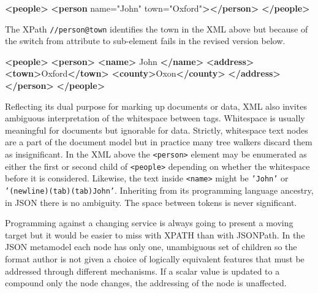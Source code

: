 \documentclass[12pt, ]{article}
\newenvironment{Shaded}{}{}
\newcommand{\KeywordTok}[1]{\textcolor[rgb]{0.00,0.44,0.13}{\textbf{{#1}}}}
\newcommand{\StringTok}[1]{\textcolor[rgb]{0.25,0.44,0.63}{{#1}}}
\newcommand{\OtherTok}[1]{\textcolor[rgb]{0.00,0.44,0.13}{{#1}}}
\newcommand{\NormalTok}[1]{{#1}}
\begin{document}
\begin{Shaded}
\begin{Highlighting}[]
\KeywordTok{<people>}
   \KeywordTok{<person}\OtherTok{ name=}\StringTok{"John"}\OtherTok{ town=}\StringTok{"Oxford"}\KeywordTok{></person>}
\KeywordTok{</people>}
\end{Highlighting}
\end{Shaded}

The XPath \texttt{//person@town} identifies the town in the XML above
but because of the switch from attribute to sub-element fails in the
revised version below.

\begin{Shaded}
\begin{Highlighting}[]
\KeywordTok{<people>}
   \KeywordTok{<person>}
      \KeywordTok{<name>}
         \NormalTok{John}
      \KeywordTok{</name>}
      \KeywordTok{<address>}
         \KeywordTok{<town>}\NormalTok{Oxford}\KeywordTok{</town>} \KeywordTok{<county>}\NormalTok{Oxon}\KeywordTok{</county>}
      \KeywordTok{</address>}
   \KeywordTok{</person>}
\KeywordTok{</people>}
\end{Highlighting}
\end{Shaded}

Reflecting its dual purpose for marking up documents or data, XML also
invites ambiguous interpretation of the whitespace between tags.
Whitespace is usually meaningful for documents but ignorable for data.
Strictly, whitespace text nodes are a part of the document model but in
practice many tree walkers discard them as insignificant. In the XML
above the \texttt{\textless{}person\textgreater{}} element may be
enumerated as either the first or second child of
\texttt{\textless{}people\textgreater{}} depending on whether the
whitespace before it is considered. Likewise, the text inside
\texttt{\textless{}name\textgreater{}} might be \texttt{'John'} or
\texttt{'(newline)(tab)(tab)John'}. Inheriting from its programming
language ancestry, in JSON there is no ambiguity. The space between
tokens is never significant.

Programming against a changing service is always going to present a
moving target but it would be easier to miss with XPATH than with
JSONPath. In the JSON metamodel each node has only one, unambiguous set
of children so the format author is not given a choice of logically
equivalent features that must be addressed through different mechanisms.
If a scalar value is updated to a compound only the node changes, the
addressing of the node is unaffected.
\end{document}
